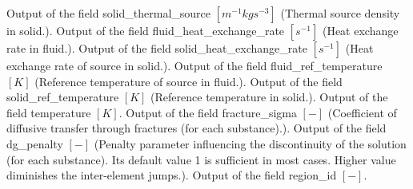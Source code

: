 \begin{SelectionType}
		\KeyItem
			{}
			{{{Output of the field solid{\_}thermal{\_}source }{$[m^{-1}kgs^{-3}]$}{ (Thermal source density in solid.).}}}
		\KeyItem
			{}
			{{{Output of the field fluid{\_}heat{\_}exchange{\_}rate }{$[s^{-1}]$}{ (Heat exchange rate in fluid.).}}}
		\KeyItem
			{}
			{{{Output of the field solid{\_}heat{\_}exchange{\_}rate }{$[s^{-1}]$}{ (Heat exchange rate of source in solid.).}}}
		\KeyItem
			{}
			{{{Output of the field fluid{\_}ref{\_}temperature }{$[K]$}{ (Reference temperature of source in fluid.).}}}
		\KeyItem
			{}
			{{{Output of the field solid{\_}ref{\_}temperature }{$[K]$}{ (Reference temperature in solid.).}}}
		\KeyItem
			{}
			{{{Output of the field temperature }{$[K]$}{.}}}
		\KeyItem
			{}
			{{{Output of the field fracture{\_}sigma }{$[-]$}{ (Coefficient of diffusive transfer through fractures (for each substance).).}}}
		\KeyItem
			{}
			{{{Output of the field dg{\_}penalty }{$[-]$}{ (Penalty parameter influencing the discontinuity of the solution (for each substance). Its default value 1 is sufficient in most cases. Higher value diminishes the inter-element jumps.).}}}
		\KeyItem
			{}
			{{{Output of the field region{\_}id }{$[-]$}{.}}}
\end{SelectionType}
